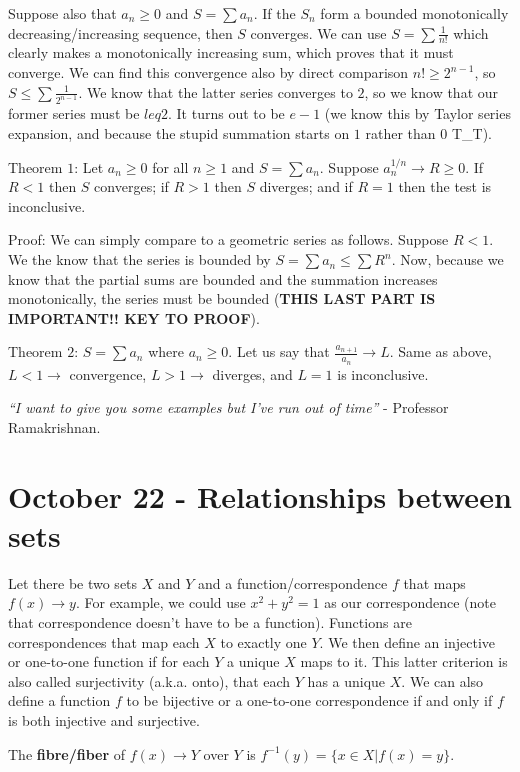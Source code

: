 \documentclass{report}
\begin{document}
Suppose also that $a_n \geq 0$ and $S = \sum{a_n}$. If the $S_n$ form a bounded monotonically decreasing/increasing sequence, then $S$ converges. We can use $S = \sum{\frac{1}{n!}}$ which clearly makes a monotonically increasing sum, which proves that it must converge. We can find this convergence also by direct comparison $n! \geq 2^{n-1}$, so $S \leq \sum{\frac{1}{2^{n-1}}}$. We know that the latter series converges to $2$, so we know that our former series must be $leq 2$. It turns out to be $e-1$ (we know this by Taylor series expansion, and because the stupid summation starts on $1$ rather than $0$ T\_T).

Theorem $1$: Let $a_n \geq 0$ for all $n \geq 1$ and $S = \sum{a_n}$. Suppose $a_n^{1/n} \to R \geq 0$. If $R < 1$ then $S$ converges; if $R > 1$ then $S$ diverges; and if $R = 1$ then the test is inconclusive. 

Proof: We can simply compare to a geometric series as follows. Suppose $R < 1$. We the know that the series is bounded by $S = \sum{a_n} \leq \sum{R^n}$. Now, because we know that the partial sums are bounded and the summation increases monotonically, the series must be bounded (\textbf{THIS LAST PART IS IMPORTANT!! KEY TO PROOF}). 

Theorem $2$: $S = \sum{a_n}$ where $a_n \geq 0$. Let us say that $\frac{a_{n+1}}{a_n} \to L$. Same as above, $L < 1 \to $ convergence, $L > 1 \to $ diverges, and $L = 1$ is inconclusive. 

\emph{``I want to give you some examples but I've run out of time''} - Professor Ramakrishnan.

\chapter{October 22 - Relationships between sets}

Let there be two sets $X$ and $Y$ and a function/correspondence $f$ that maps $f(x) \rightarrow y$. For example, we could use $x^2 + y^2 = 1$ as our correspondence (note that correspondence doesn't have to be a function). Functions are correspondences that map each $X$ to exactly one $Y$. We then define an injective or one-to-one function if for each $Y$ a unique $X$ maps to it. This latter criterion is also called surjectivity (a.k.a. onto), that each $Y$ has a unique $X$. We can also define a function $f$ to be bijective or a one-to-one correspondence if and only if $f$ is both injective and surjective.

The \textbf{fibre/fiber} of $f(x) \to Y$ over $Y$ is $f^{-1}(y) = \{x \in X| f(x) = y\}$. 
\end{document}
